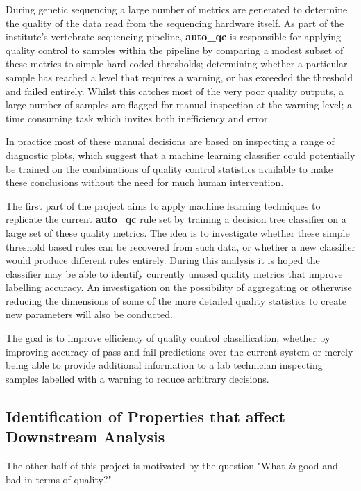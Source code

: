 During genetic sequencing a large number of metrics are generated to determine
the quality of the data read from the sequencing hardware itself. As part of the
institute's vertebrate sequencing pipeline\citep{github:vr-pipe},
\textbf{auto\_qc} is responsible for applying quality control to samples within
the pipeline by comparing a modest subset of these metrics to simple hard-coded
thresholds; determining whether a particular sample has reached a level that
requires a warning, or has exceeded the threshold and failed entirely. Whilst
this catches most of the very poor quality outputs, a large number of samples
are flagged for manual inspection at the warning level; a time consuming task
which invites both inefficiency and error\citep{marireport}.

In practice most of these manual decisions are based on inspecting a range of
diagnostic plots, which suggest that a machine learning classifier could
potentially be trained on the combinations of quality control statistics
available to make these conclusions without the need for much human
intervention.

The first part of the project aims to apply machine learning techniques to
replicate the current \textbf{auto\_qc} rule set by training a decision tree
classifier on a large set of these quality metrics. The idea is to investigate
whether these simple threshold based rules can be recovered from such data, or
whether a new classifier would produce different rules entirely. During this
analysis it is hoped the classifier may be able to identify currently unused
quality metrics that improve labelling accuracy. An investigation on the
possibility of aggregating or otherwise reducing the dimensions of some of the
more detailed quality statistics to create new parameters will also be
conducted.

The goal is to improve efficiency of quality control classification, whether by
improving accuracy of pass and fail predictions over the current system or
merely being able to provide additional information to a lab technician
inspecting samples labelled with a warning to reduce arbitrary decisions.

\subsection{Identification of Properties that affect Downstream Analysis}

The other half of this project is motivated by the question "What \textit{is}
good and bad in terms of quality?"

